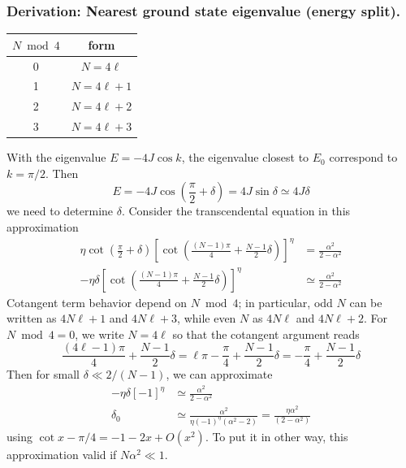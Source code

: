 \documentclass[../../../main.tex]{subfiles}
\begin{document}
\subsubsection{Derivation: Nearest ground state eigenvalue (energy split).}
\begin{table}
  \centering
  \begin{tabular}{cc}
    \toprule
    $N\bmod4$ & form        \\
    \midrule
    0         & $ N=4\ell$  \\
    1         & $N=4\ell+1$ \\
    2         & $N=4\ell+2$ \\
    3         & $N=4\ell+3$ \\
    \bottomrule
  \end{tabular}
\end{table}
With the eigenvalue $E = -4J \cos k$, the eigenvalue closest to $E_0$ correspond to $k = \pi/2$.
Then
\begin{equation*}
  E=-4J\cos\left(\frac{\pi}{2}+\delta\right) =4J\sin\delta \simeq 4J\delta
\end{equation*}
we need to determine $\delta$.
Consider the transcendental equation in this approximation
\begin{align*}
  \eta\cot \left(\frac{\pi}{2}+\delta\right) \left[ \cot\left(\frac{(N-1)\pi}{4} +\frac{N-1}{2}\delta\right) \right]^\eta
                                                                                              & =  \frac{\alpha^2}{2-\alpha^2}     \\
  -\eta\delta \left[ \cot\left( \frac{(N-1)\pi}{4} + \frac{N-1}{2}\delta \right) \right]^\eta & \simeq \frac{\alpha^2}{2-\alpha^2}
\end{align*}
Cotangent term behavior depend on \(N\bmod 4\); in particular, odd $N$ can be written as $4N\ell+1$ and $4N\ell+3$, while even $N$ as $4N\ell$ and $4N\ell+2$.
For $N \bmod4 = 0$, we write $N=4\ell$ so that the cotangent argument reads
\begin{equation*}
  \frac{(4\ell-1)\pi}{4}+\frac{N-1}{2}\delta
  =\ell\pi -\frac{\pi}{4}+\frac{N-1}{2}\delta
  = -\frac{\pi}{4}+\frac{N-1}{2}\delta
\end{equation*}
Then for small $\delta\ll 2/(N-1)$, we can approximate
\begin{align*}
  -\eta\delta \left[-1\right]^\eta
   & \simeq \frac{\alpha^2}{2-\alpha^2}                \\
  \delta_{0}
   & \simeq \frac{\alpha^2}{\eta(-1)^\eta(\alpha^2-2)}
  =\frac{\eta\alpha^2}{(2-\alpha^2)}
\end{align*}
using $\cot x-\pi/4 = -1-2x+O(x^2)$.
To put it in other way, this approximation valid if $N\alpha^2\ll1$.
\end{document}
